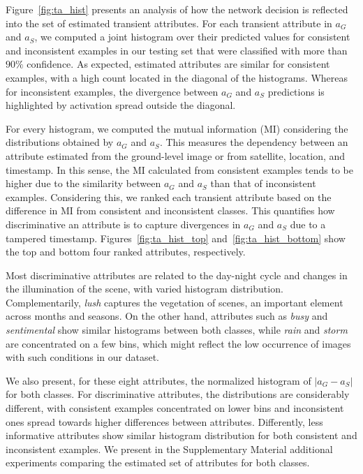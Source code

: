 \documentclass[journal]{IEEEtran}
\begin{document}
        Figure~\ref{fig:ta_hist} presents an analysis of how the network decision is reflected into the set of estimated transient attributes. For each transient attribute in $a_G$ and $a_S$, we computed a joint histogram over their predicted values for consistent and inconsistent examples in our testing set that were classified with more than $90\%$ confidence. As expected, estimated attributes are similar for consistent examples, with a high count located in the diagonal of the histograms. Whereas for inconsistent examples, the divergence between $a_G$ and $a_S$ predictions is highlighted by activation spread outside the diagonal. 
        
        
        For every histogram, we computed the mutual information (MI) considering the distributions obtained by $a_G$ and $a_S$. This measures the dependency between an attribute estimated from the ground-level image or from satellite, location, and timestamp. In this sense, the MI calculated from consistent examples tends to be higher due to the similarity between $a_G$ and $a_S$ than that of inconsistent examples. Considering this, we ranked each transient attribute based on the difference in MI from consistent and inconsistent classes. This quantifies how discriminative an attribute is to capture divergences in $a_G$ and $a_S$ due to a tampered timestamp. Figures~\ref{fig:ta_hist_top} and~\ref{fig:ta_hist_bottom} show the top and bottom four ranked attributes, respectively. 
        
        Most discriminative attributes are related to the day-night cycle and changes in the illumination of the scene, with varied histogram distribution. Complementarily, \textit{lush} captures the vegetation of scenes, an important element across months and seasons. On the other hand, attributes such as \textit{busy} and \textit{sentimental} show similar histograms between both classes, while \textit{rain} and \textit{storm} are concentrated on a few bins, which might reflect the low occurrence of images with such conditions in our dataset. 
        
        We also present, for these eight attributes, the normalized histogram of $|a_G - a_S|$ for both classes. For discriminative attributes, the distributions are considerably different, with consistent examples concentrated on lower bins and inconsistent ones spread towards higher differences between attributes. Differently, less informative attributes show similar histogram distribution for both consistent and inconsistent examples. We present in the Supplementary Material additional experiments comparing the estimated set of attributes for both classes.
        
\end{document}
